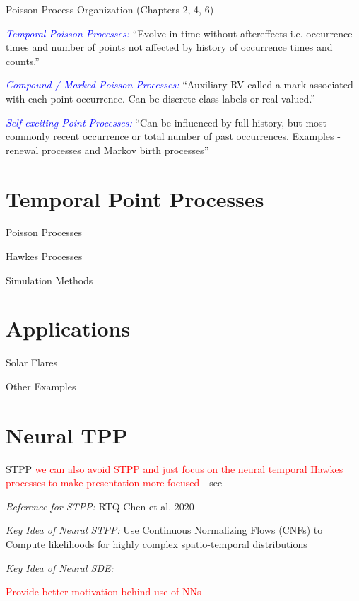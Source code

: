 \documentclass{beamer}
\begin{document}
\begin{frame}{Poisson Process Organization}
    (Chapters 2, 4, 6)

    \textcolor{blue}{\emph{Temporal Poisson Processes: }} ``Evolve in time without aftereffects i.e. occurrence times and number of points not affected by history of occurrence times and counts.''

    \textcolor{blue}{\emph{Compound / Marked Poisson Processes: }} ``Auxiliary RV called a mark associated with each point occurrence. Can be discrete class labels or real-valued.''

    \textcolor{blue}{\emph{Self-exciting Point Processes: }} ``Can be influenced by full history, but most commonly recent occurrence or total number of past occurrences. Examples - renewal processes and Markov birth processes''
\end{frame}

\section{Temporal Point Processes}
\begin{frame}{Poisson Processes}
    
\end{frame}

\begin{frame}{Hawkes Processes}
    
\end{frame}

\begin{frame}{Simulation Methods}
    
\end{frame}

\section{Applications}
\begin{frame}{Solar Flares}
    
\end{frame}

\begin{frame}{Other Examples}
    
\end{frame}

\section{Neural TPP}
\begin{frame}{STPP}
    \textcolor{red}{we can also avoid STPP and just focus on the neural temporal Hawkes processes to make presentation more focused } - see \cite{jia_neural_2020}

    \emph{Reference for STPP:} RTQ Chen et al. 2020\cite{chen_neural_2020}

    \emph{Key Idea of Neural STPP:} Use Continuous Normalizing Flows (CNFs) to Compute likelihoods for highly complex spatio-temporal distributions

    \emph{Key Idea of Neural SDE:} 

    \textcolor{red}{Provide better motivation behind use of NNs}
\end{frame}
\end{document}
